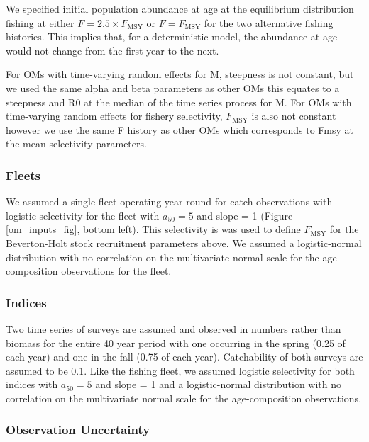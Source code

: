 \documentclass[
  12pt,
]{article}
\newcommand{\Fmsy}{\ensuremath{F_{\text{MSY}}}\xspace}
\begin{document}
We specified initial population abundance at age at the equilibrium
distribution fishing at either \(F = 2.5\times \Fmsy\) or \(F = \Fmsy\)
for the two alternative fishing histories. This implies that, for a
deterministic model, the abundance at age would not change from the
first year to the next.

For OMs with time-varying random effects for M, steepness is not
constant, but we used the same alpha and beta parameters as other OMs
this equates to a steepness and R0 at the median of the time series
process for M. For OMs with time-varying random effects for fishery
selectivity, \Fmsy is also not constant however we use the same F
history as other OMs which corresponds to Fmsy at the mean selectivity
parameters.

\hypertarget{fleets}{%
\subsubsection*{Fleets}\label{fleets}}

We assumed a single fleet operating year round for catch observations
with logistic selectivity for the fleet with \(a_{50} = 5\) and slope =
1 (Figure \ref{om_inputs_fig}, bottom left). This selectivity is was
used to define \Fmsy for the Beverton-Holt stock recruitment parameters
above. We assumed a logistic-normal distribution with no correlation on
the multivariate normal scale for the age-composition observations for
the fleet.

\hypertarget{indices}{%
\subsubsection*{Indices}\label{indices}}

Two time series of surveys are assumed and observed in numbers rather
than biomass for the entire 40 year period with one occurring in the
spring (0.25 of each year) and one in the fall (0.75 of each year).
Catchability of both surveys are assumed to be 0.1. Like the fishing
fleet, we assumed logistic selectivity for both indices with
\(a_{50} = 5\) and slope = 1 and a logistic-normal distribution with no
correlation on the multivariate normal scale for the age-composition
observations.

\hypertarget{observation-uncertainty}{%
\subsubsection*{Observation Uncertainty}\label{observation-uncertainty}}
\end{document}
